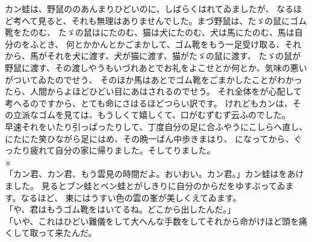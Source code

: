 \documentclass[
a4paper,
10pt,
book]
{tarticle}
\begin{document}
\newpage
\setcounter{page}{6}
\thispagestyle{fancy}
\indent カン蛙は、野鼠ののあんまりひどいのに、しばらくはれてゐましたが、
なるほど考へて見ると、それも無理はありませんでした。まづ野鼠は、たゞの鼠にゴム靴をたのむ、
たゞの鼠はにたのむ、猫は犬にたのむ、犬は馬にたのむ、馬は自分のをふとき、
何とかかんとかごまかして、ゴム靴をもう一足受け取る、それから、馬がそれを犬に渡す、犬が猫に渡す、猫がたゞの鼠に渡す、
たゞの鼠が野鼠に渡す、その渡しやうもいづれあとでお礼をよこせとか何とか、気味の悪いがついてゐたのでせう、
そのほか馬はあとでゴム靴をごまかしたことがわかったら、人間からよほどひどい目にあはされるのでせう。
それ全体をが心配して考へるのですから、とても命にさはるほどつらい訳です。
けれどもカンは、その立派なゴムを見ては、もうしくて嬉しくて、口がむずむず云ふのでした。\\
\indent 早速それをいたり引っぱったりして、丁度自分の足に合ふやうにこしらへ直し、にたにた笑ひながら足にはめ、その晩一ばん中歩きまはり、
になってから、ぐったり疲れて自分の家に帰りました。そしてりました。\\
\indent \indent \indent \indent \indent \indent \indent \indent \indent \indent ※\\
「カン君、カン君、もう雲見の時間だよ。おいおい。カン君。」カン蛙はをあけました。
見るとブン蛙とベン蛙とがしきりに自分のからだをゆすぶってゐます。なるほど、
東にはうすい色の雲の峯が美しくえてゐます。\\
「や、君はもうゴム靴をはいてるね。どこから出したんだ。」\\
「いや、これはひどい難儀をして大へんな手数をしてそれから命がけほど頭を痛くして取って来たんだ。
\end{document}
